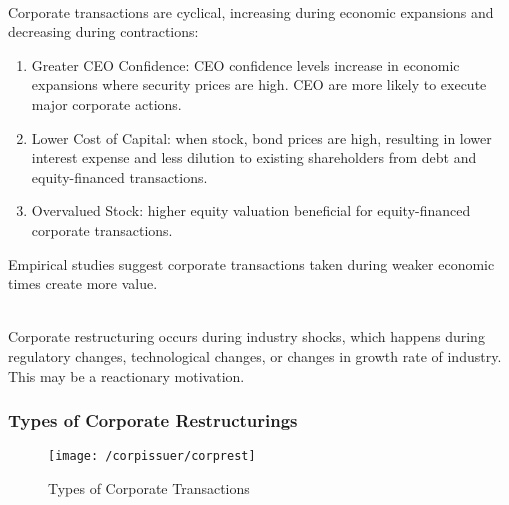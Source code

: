 \begin{remark} \\
Corporate transactions are cyclical, increasing during economic expansions and decreasing during contractions:
\begin{enumerate}[label=\roman*.]
\setlength{\itemsep}{0pt}
\item Greater CEO Confidence: CEO confidence levels increase in economic expansions where security prices are high. CEO are more likely to execute major corporate actions.
\item Lower Cost of Capital: when stock, bond prices are high, resulting in lower interest expense and less dilution to existing shareholders from debt and equity-financed transactions.
\item Overvalued Stock: higher equity valuation beneficial for equity-financed corporate transactions. 
\end{enumerate}
Empirical studies suggest corporate transactions taken during weaker economic times create more value.
\end{remark}

\begin{remark} \\
Corporate restructuring occurs during industry shocks, which happens during regulatory changes, technological changes, or changes in growth rate of industry. This may be a reactionary motivation.
\end{remark}

\subsubsection{Types of Corporate Restructurings}

\begin{figure}[H]
\centering
\texttt{[image: /corpissuer/corprest]}
\caption{Types of Corporate Transactions}
\end{figure}

